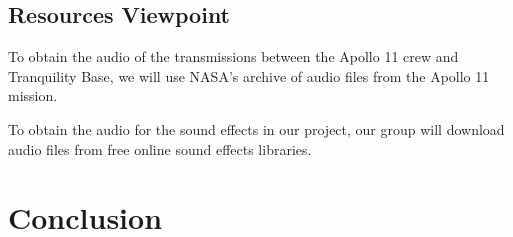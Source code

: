 \documentclass[onecolumn, draftclsnofoot,10pt, compsoc]{IEEEtran}
\begin{document}
    \subsection{Resources Viewpoint}
    To obtain the audio of the transmissions between the Apollo 11 crew and Tranquility Base, we will use NASA's archive of audio files from the Apollo 11 mission.
    
    To obtain the audio for the sound effects in our project, our group will download audio files from free online sound effects libraries.


\section{Conclusion}
\end{document}
